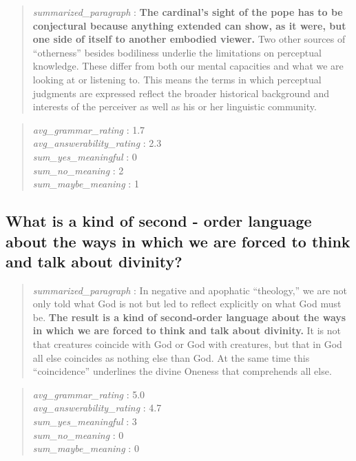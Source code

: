 \begin{quote}
\emph{summarized\_paragraph} : \textbf{The cardinal's sight of the pope
has to be conjectural because anything extended can show, as it were,
but one side of itself to another embodied viewer.} Two other sources of
``otherness'' besides bodiliness underlie the limitations on perceptual
knowledge. These differ from both our mental capacities and what we are
looking at or listening to. This means the terms in which perceptual
judgments are expressed reflect the broader historical background and
interests of the perceiver as well as his or her linguistic community.
\end{quote}

\begin{quote}
\emph{avg\_grammar\_rating} : 1.7\\
\emph{avg\_answerability\_rating} : 2.3\\
\emph{sum\_yes\_meaningful} : 0\\
\emph{sum\_no\_meaning} : 2\\
\emph{sum\_maybe\_meaning} : 1
\end{quote}

\hypertarget{what-is-a-kind-of-second---order-language-about-the-ways-in-which-we-are-forced-to-think-and-talk-about-divinity}{%
\subsection{What is a kind of second - order language about the ways in
which we are forced to think and talk about
divinity?}\label{what-is-a-kind-of-second---order-language-about-the-ways-in-which-we-are-forced-to-think-and-talk-about-divinity}}

\begin{quote}
\emph{summarized\_paragraph} : In negative and apophatic ``theology,''
we are not only told what God is not but led to reflect explicitly on
what God must be. \textbf{The result is a kind of second-order language
about the ways in which we are forced to think and talk about divinity.}
It is not that creatures coincide with God or God with creatures, but
that in God all else coincides as nothing else than God. At the same
time this ``coincidence'' underlines the divine Oneness that comprehends
all else.
\end{quote}

\begin{quote}
\emph{avg\_grammar\_rating} : 5.0\\
\emph{avg\_answerability\_rating} : 4.7\\
\emph{sum\_yes\_meaningful} : 3\\
\emph{sum\_no\_meaning} : 0\\
\emph{sum\_maybe\_meaning} : 0
\end{quote}

